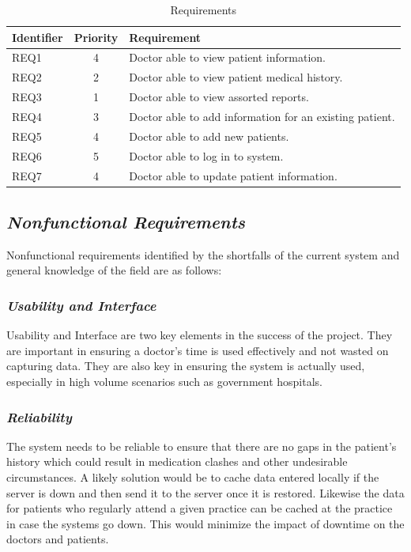 \documentclass[a4paper]{article}
\begin{document}
\begin{table}[h!]
	\centering
	\caption{Requirements}
	\label{tab:table1}
	\begin{tabular}{l|c|l}
		Identifier & Priority & Requirement\\
		\hline
		REQ1 & 4 & Doctor able to view patient information.\\
		REQ2 & 2 & Doctor able to view patient medical history.\\
		REQ3 & 1 & Doctor able to view assorted reports.\\
		REQ4 & 3 & Doctor able to add information for an existing patient.\\
		REQ5 & 4 & Doctor able to add new patients.\\
		REQ6 & 5 & Doctor able to log in to system.\\
		REQ7 & 4 & Doctor able to update patient information.\\
	\end{tabular}
\end{table}
		
\subsection{\textit{Nonfunctional Requirements}}
Nonfunctional requirements identified by the shortfalls of the current system and general knowledge of the field are as follows:
	\subsubsection{\textit{Usability and Interface}}
	Usability and Interface are two key elements in the success of the project. They are important in ensuring a doctor's time is used effectively and not wasted on capturing data. They are also key in ensuring the system is actually used, especially in high volume scenarios such as government hospitals.
	
	\subsubsection{\textit{Reliability}}
	The system needs to be reliable to ensure that there are no gaps in the patient's history which could result in medication clashes and other undesirable circumstances. A likely solution would be to cache data entered locally if the server is down and then send it to the server once it is restored. Likewise the data for patients who regularly attend a given practice can be cached at the practice in case the systems go down. This would minimize the impact of downtime on the doctors and patients.
	
\end{document}
